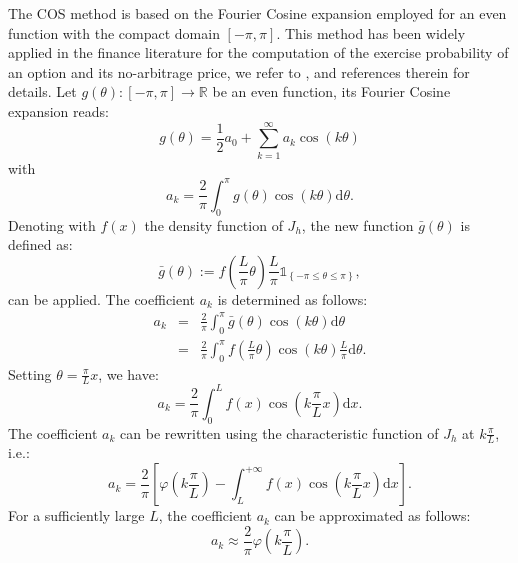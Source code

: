 The COS method is based on the Fourier Cosine expansion employed for an even function with the compact domain \(\left[-\pi, \pi \right]\). This method has been widely applied in the finance literature for the computation of the exercise probability of an option and its no-arbitrage price, we refer to \citet{fang2009novel}, \citet{fang2011fourier} and references therein for details. Let \(g\left(\theta\right):\left[-\pi, \pi \right] \rightarrow \mathbb{R}\) be an even function, its Fourier Cosine expansion reads:
\begin{equation}
g\left(\theta\right)=\frac12 a_0 +\sum_{k=1}^{\infty} a_k \cos\left(k\theta\right)
\label{eq:ExpCosF}
\end{equation}
with
\begin{equation*}
a_k = \frac{2}{\pi}\int_0^{\pi}g\left(\theta\right)\cos\left(k\theta\right)\mbox{d}\theta.
\end{equation*}
Denoting with \(f\left(x\right)\) the density function of \(J_h\), the new function \(\bar{g}\left(\theta\right)\) is defined as:
\begin{equation}
\bar{g}\left(\theta\right):=f\left(\frac{L}{\pi}\theta\right)\frac{L}{\pi} \mathbb{1}_{\left\{-\pi \leq \theta \leq \pi\right\} },
\label{eq:newg}
\end{equation}
can be applied. The coefficient \(a_k\) is determined as follows:
\begin{eqnarray*}
a_k &=& \frac{2}{\pi}\int_0^{\pi}\bar{g}\left(\theta\right) \cos\left(k\theta\right)\mbox{d}\theta\nonumber\\
&=&\frac{2}{\pi}\int_0^{\pi} f\left(\frac{L}{\pi}\theta\right)\cos\left(k\theta\right)\frac{L}{\pi}\mbox{d}\theta.\nonumber
\end{eqnarray*}
Setting \(\theta = \frac{\pi}{L}x\), we have:
\begin{equation}
a_k = \frac{2}{\pi}\int_0^{L}f\left(x\right) \cos\left(k\frac{\pi}{L}x\right)\mbox{d}x.
\end{equation}
The coefficient \(a_k\) can be rewritten using the characteristic function of \(J_h\) at \(k\frac{\pi}{L}\), i.e.:
\begin{equation}
a_k = \frac{2}{\pi}\left[\varphi\left(k\frac{\pi}{L}\right)-\int_{L}^{+\infty}f\left(x\right) \cos\left(k\frac{\pi}{L}x\right)\mbox{d}x\right].
\end{equation}
For a sufficiently large \(L\), the coefficient \(a_k\) can be approximated as follows:
\begin{equation}
a_k \approx \frac{2}{\pi} \varphi\left(k\frac{\pi}{L}\right).
\end{equation}
